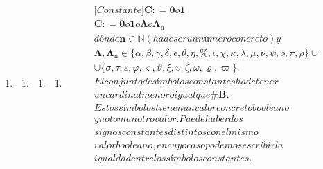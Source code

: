 \begin{enumerate}
\def\labelenumi{\arabic{enumi}.}
\setcounter{enumi}{1}
\item
  \begin{enumerate}
  \def\labelenumii{\arabic{enumii}.}
  \item
    \begin{enumerate}
    \def\labelenumiii{\arabic{enumiii}.}
    \item
      \begin{enumerate}
      \def\labelenumiv{\arabic{enumiv}.}
      \item
        \[\begin{matrix}
        {{\lbrack\mathbf{\mathit{Constante}}\rbrack}{\mathbf{C}{: =}\mathbf{0}o\mathbf{1}}} \\
        {\mathbf{C}{: =}\mathbf{0}o\mathbf{1}o\mathbf{\Lambda}o\mathbf{\Lambda_{\mathrm{n}}}} \\
        {\mathit{dónde}{\mathbf{n} \in \mathbb{N}}{({\mathit{ha}\mathit{de}\mathit{ser}\mathit{un}\mathit{número}\mathit{concreto}})}y} \\
        {\mathbf{\Lambda},{\mathbf{\Lambda_{\mathrm{n}}} \in {{\{{\alpha,\beta,\gamma,\delta,\epsilon,\theta,\eta,\%,\iota,\chi,\kappa,\lambda,\mu,\nu,\psi,ο,\pi,\rho}\}} \cup}}} \\
        {{\cup {\{{\sigma,\tau,\varepsilon,\varphi,\varsigma,\vartheta,\xi,\upsilon,\zeta,\omega,\varrho,\varpi}\}}}.} \\
        {\mathit{El}\mathit{conjunto}\mathit{de}\mathit{símbolos}\mathit{constantes}\mathit{ha}\mathit{de}\mathit{tener}} \\
        {\mathit{un}\mathit{cardinal}\mathit{menor}o\mathit{igual}\mathit{que}\mathbf{\# B}.} \\
        {\mathit{Estos}\mathit{símbolos}\mathit{tienen}\mathit{un}\mathit{valor}\mathit{concreto}\mathit{booleano}} \\
        {y\mathit{no}\mathit{toman}\mathit{otro}\mathit{valor.}\mathit{Puede}\mathit{haber}\mathit{dos}} \\
        {\mathit{signos}\mathit{constantes}\mathit{distintos}\mathit{con}\mathit{el}\mathit{mismo}} \\
        {\mathit{valor}\mathit{booleano},\mathit{en}\mathit{cuyo}\mathit{caso}\mathit{podemos}\mathit{escribir}\mathit{la}} \\
        {\mathit{igualdad}\mathit{entre}\mathit{los}\mathit{símbolos}\mathit{constantes.}}
        \end{matrix}\]


\end{enumerate}
\end{enumerate}
\end{enumerate}
\end{enumerate}
